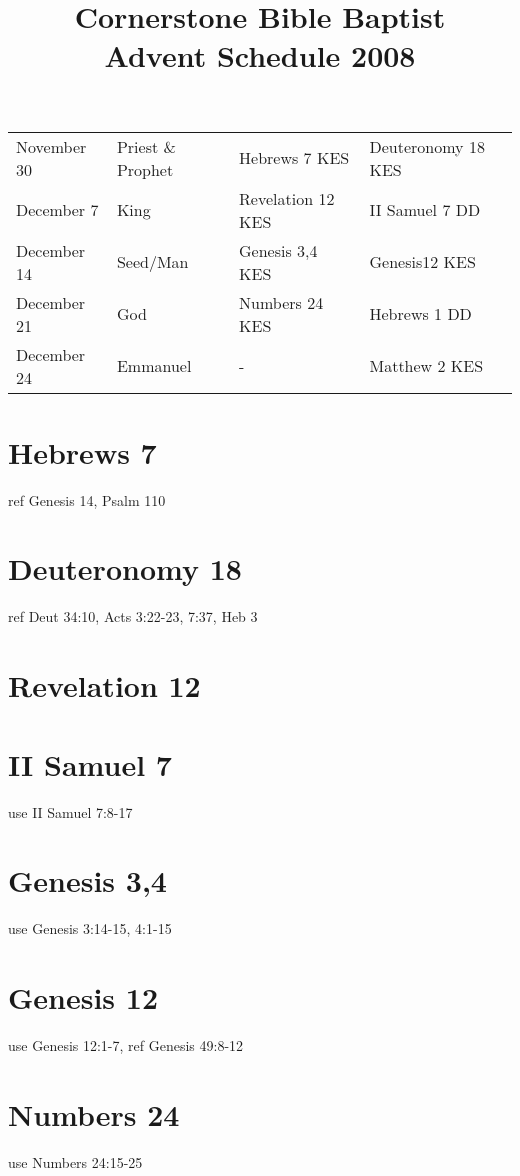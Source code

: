 \documentclass{article}
\title{Cornerstone Bible Baptist \\ Advent Schedule 2008}
\begin{document}
\maketitle

\noindent
\begin{tabular}{llll}
November 30 & Priest \& Prophet   & Hebrews 7 KES     & Deuteronomy 18 KES           \\
December 7  & King                & Revelation 12 KES & II Samuel 7 DD \\
December 14 & Seed/Man            & Genesis 3,4 KES   & Genesis12 KES \\
December 21 & God                 & Numbers 24 KES    & Hebrews 1 DD \\
December 24 & Emmanuel            & -                 & Matthew 2 KES\\
\end{tabular}

\section{Hebrews 7} ref Genesis 14, Psalm 110

\section{Deuteronomy 18} ref Deut 34:10, Acts 3:22-23, 7:37, Heb 3

\section{Revelation 12}

\section{II Samuel 7} use II Samuel 7:8-17

\section{Genesis 3,4} use Genesis 3:14-15, 4:1-15

\section{Genesis 12} use Genesis 12:1-7, ref Genesis 49:8-12

\section{Numbers 24} use Numbers 24:15-25
\end{document}
